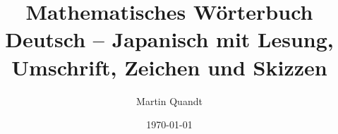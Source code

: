 \newcommand{\lesenabstand}{1.12}
\newenvironment{lesen}{%
	\setstretch{\lesenabstand}%
	\begin{longtable}{@{}>{\raggedright\arraybackslash}p{4.6cm} >{\raggedright\arraybackslash}p{12.1cm}@{}}}{%
	\end{longtable}\vspace{-1.2em}}

\newcommand{\anmerkung}[1]{\par\smallskip\noindent{\small\sloppy\textbf{Hinweis:} #1\par}\smallskip}

\newcommand{\randpunkt}[2]{\if#1g\fill[blue] (#2,0) circle (3.2pt);\else\filldraw[fill=white, draw=blue, very thick] (#2,0) circle (3.2pt);\fi}
\newcommand{\intervall}[2]{\tikz[baseline=-0.6ex, scale=0.6]{\draw[achse] (-0.3,0) -- (5.6,0);
	\draw[blue, line width=2pt] (1,0) -- (4,0); \randpunkt{#1}{1} \randpunkt{#2}{4}
	\node[below=2pt, font=\scriptsize] at (1,0) {$a$}; \node[below=2pt, font=\scriptsize] at (4,0) {$b$};}}
\newcommand{\intervallR}{\tikz[baseline=-0.6ex, scale=0.6]{\draw[achse] (-0.3,0) -- (5.6,0);
	\draw[blue, line width=2pt, -{Stealth}] (1,0) -- (5.3,0); \randpunkt{g}{1}
	\node[below=2pt, font=\scriptsize] at (1,0) {$a$};}}

\newcommand{\ub}[3]{\underbrace{\text{\Large$#1$}}_{\text{\footnotesize\shortstack{#2\\\color{black!60}#3}}}}

\newcommand{\platz}{\par\ifdim\dimexpr\pagegoal-\pagetotal\relax<5.5cm \newpage\fi}


\title{Mathematisches Wörterbuch\\[0.3em] \large Deutsch -- Japanisch mit Lesung, Umschrift, Zeichen und Skizzen}
\author{Martin Quandt}
\date{\today}
\pagestyle{plain}
\setlength{\tabcolsep}{4pt}


